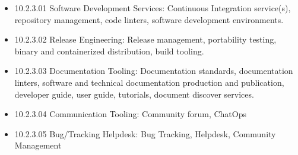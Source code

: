 \begin{itemize}

\item
  10.2.3.01 Software Development Services: Continuous Integration
  service(s), repository management, code linters, software development
  environments.
\item
  10.2.3.02 Release Engineering: Release management, portability
  testing, binary and containerized distribution, build tooling.
\item
  10.2.3.03 Documentation Tooling: Documentation standards,
  documentation linters, software and technical documentation production
  and publication, developer guide, user guide, tutorials, document
  discover services.
\item
  10.2.3.04 Communication Tooling: Community forum, ChatOps
\item
  10.2.3.05 Bug/Tracking Helpdesk: Bug Tracking, Helpdesk, Community
  Management
\end{itemize}
